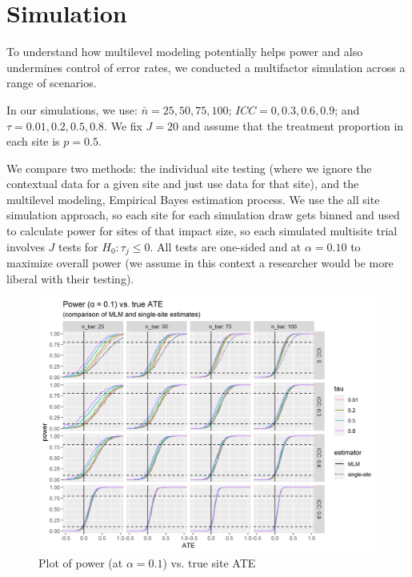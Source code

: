 \documentclass[]{article}
\begin{document}
	\section{Simulation}
	To understand how multilevel modeling potentially helps power and also undermines control of error rates, we conducted a multifactor simulation across a range of  scenarios.
	
	In our simulations, we use: $\bar{n} = 25, 50, 75, 100$; $ICC = 0, 0.3, 0.6, 0.9$; and $\tau = 0.01, 0.2, 0.5, 0.8$.
	We fix $J = 20$ and assume that the treatment proportion in each site is $p=0.5$.
	
	We compare two methods: the individual site testing (where we ignore the contextual data for a given site and just use data for that site), and the multilevel modeling, Empirical Bayes estimation process.
	We use the all site simulation approach, so each site for each simulation draw gets binned and used to calculate power for sites of that impact size, so each simulated multisite trial involves $J$ tests for $H_0: \tau_j \leq 0$.
	All tests are one-sided and at $\alpha=0.10$ to maximize overall power (we assume in this context a researcher would be more liberal with their testing).
	
	
	
	\begin{figure}[ht]
		\centering
		\includegraphics[width=\textwidth]{power_plot_comp}
		\caption{Plot of power (at $\alpha = 0.1$) vs. true site ATE}
		\label{fig:power_plot}
	\end{figure}
	
\end{document}
